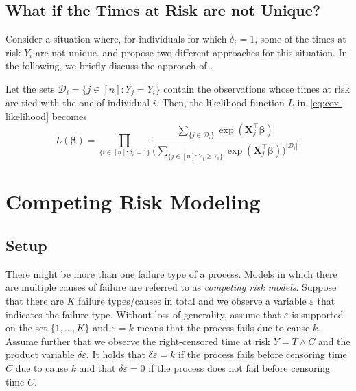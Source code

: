 \documentclass[11pt]{article}
\newcommand{\X}{\mathbf{X}}
\renewcommand{\b}{\bm{\beta}}
\begin{document}
\subsection{What if the Times at Risk are not Unique?} \label{sec:non-unique-times}
Consider a situation where, for individuals for which $\delta_i = 1$, some of the times at risk $Y_i$ are not unique. \cite{breslow1975} and \cite{efron1977} propose two different approaches for this situation. In the following, we briefly discuss the approach of \cite{breslow1975}.

Let the sets $\mathcal{D}_i = \{ j \in [n] : Y_j = Y_i \}$ contain the observations whose times at risk are tied with the one of individual $i$. Then, the likelihood function $L$ in~\eqref{eq:cox-likelihood} becomes
\begin{equation*} 
        L(\b)
        =
        \prod_{\{ i \in [n] : \delta_i = 1 \}}
        \frac{ \sum_{\{j\in \mathcal{D}_i\}}\exp(\X_j^\top \b) }{ \Big( \sum_{\{ j\in[n] : Y_j \geq Y_i \}} \exp(\X_j^\top \b) \Big)^{|\mathcal{D}_i|} }.
\end{equation*}

\section{Competing Risk Modeling}
\subsection{Setup}
There might be more than one failure type of a process. Models in which there are multiple causes of failure are referred to as \textit{competing risk models}. Suppose that there are $K$ failure types/causes in total and we observe a variable $\varepsilon$ that indicates the failure type. Without loss of generality, assume that $\varepsilon$ is supported on the set $\{1,\dots,K\}$ and $\varepsilon = k$ means that the process fails due to cause $k$. Assume further that we observe the right-censored time at risk $Y = T \wedge C$ and the product variable $\delta \varepsilon.$ It holds that $\delta \varepsilon = k$ if the process fails before censoring time $C$ due to cause $k$ and that $\delta \varepsilon = 0$ if the process does not fail before censoring time $C$. 
\end{document}

